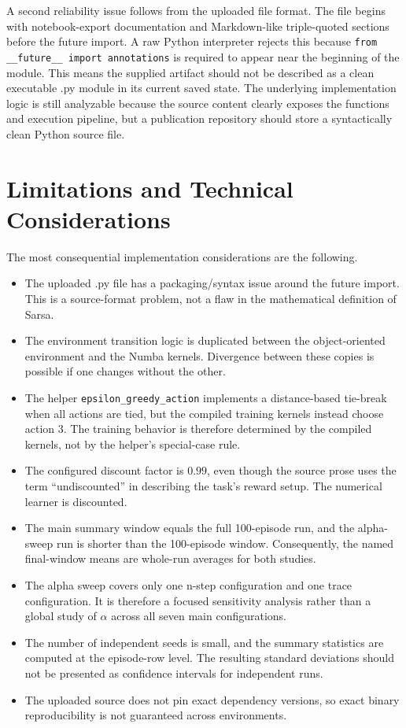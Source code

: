 \documentclass[11pt,a4paper]{article}
\begin{document}
A second reliability issue follows from the uploaded file format. The file begins with notebook-export documentation and Markdown-like triple-quoted sections before the future import. A raw Python interpreter rejects this because \texttt{from \_\_future\_\_ import annotations} is required to appear near the beginning of the module. This means the supplied artifact should not be described as a clean executable .py module in its current saved state. The underlying implementation logic is still analyzable because the source content clearly exposes the functions and execution pipeline, but a publication repository should store a syntactically clean Python source file.

\section{Limitations and Technical Considerations}
The most consequential implementation considerations are the following.

\begin{itemize}
\item The uploaded .py file has a packaging/syntax issue around the future import. This is a source-format problem, not a flaw in the mathematical definition of Sarsa.
\item The environment transition logic is duplicated between the object-oriented environment and the Numba kernels. Divergence between these copies is possible if one changes without the other.
\item The helper \texttt{epsilon\_greedy\_action} implements a distance-based tie-break when all actions are tied, but the compiled training kernels instead choose action 3. The training behavior is therefore determined by the compiled kernels, not by the helper's special-case rule.
\item The configured discount factor is $0.99$, even though the source prose uses the term ``undiscounted'' in describing the task's reward setup. The numerical learner is discounted.
\item The main summary window equals the full 100-episode run, and the alpha-sweep run is shorter than the 100-episode window. Consequently, the named final-window means are whole-run averages for both studies.
\item The alpha sweep covers only one n-step configuration and one trace configuration. It is therefore a focused sensitivity analysis rather than a global study of $\alpha$ across all seven main configurations.
\item The number of independent seeds is small, and the summary statistics are computed at the episode-row level. The resulting standard deviations should not be presented as confidence intervals for independent runs.
\item The uploaded source does not pin exact dependency versions, so exact binary reproducibility is not guaranteed across environments.
\end{itemize}
\end{document}
